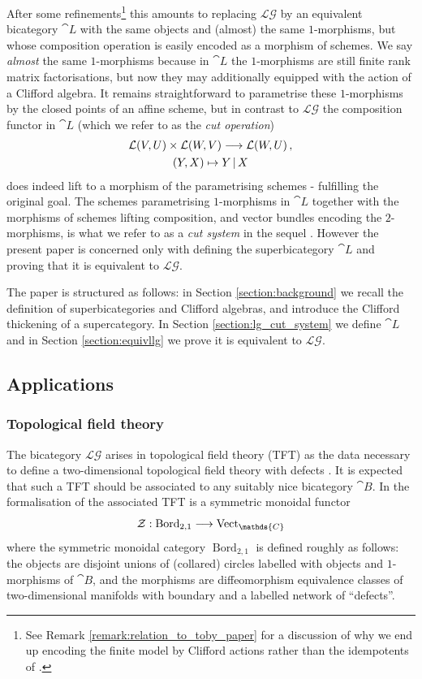\documentclass[english,letter paper,12pt,leqno]{article}
\theoremstyle{example}
\numberwithin{equation}{section}
\def\LG{\mathcal{LG}}
\def\nC{\mathds{C}}
\begin{document}
After some refinements\footnote{See Remark \ref{remark:relation_to_toby_paper} for a discussion of why we end up encoding the finite model by Clifford actions rather than the idempotents of \cite{dm1102.2957}.} this amounts to replacing $\LG$ by an equivalent bicategory $\cat{L}$ with the same objects and (almost) the same $1$-morphisms, but whose composition operation is easily encoded as a morphism of schemes. We say \emph{almost} the same $1$-morphisms because in $\cat{L}$ the $1$-morphisms are still finite rank matrix factorisations, but now they may additionally equipped with the action of a Clifford algebra. It remains straightforward to parametrise these $1$-morphisms by the closed points of an affine scheme, but in contrast to $\LG$ the composition functor in $\cat{L}$ (which we refer to as the \emph{cut operation})
\begin{gather}
\mathcal{L}(V,U) \times \mathcal{L}(W,V) \longrightarrow \mathcal{L}(W,U)\,,\\
(Y,X) \mapsto Y \,|\, X
\end{gather}
does indeed lift to a morphism of the parametrising schemes - fulfilling the original goal. The schemes parametrising $1$-morphisms in $\cat{L}$ together with the morphisms of schemes lifting composition, and vector bundles encoding the $2$-morphisms, is what we refer to as a \emph{cut system} in the sequel \cite{cutsystems2}. However the present paper is concerned only with defining the superbicategory $\cat{L}$ and proving that it is equivalent to $\LG$.

The paper is structured as follows: in Section \ref{section:background} we recall the definition of superbicategories and Clifford algebras, and introduce the Clifford thickening of a supercategory. In Section \ref{section:lg_cut_system} we define $\cat{L}$ and in Section \ref{section:equivllg} we prove it is equivalent to $\LG$.

\subsection{Applications}

\subsubsection{Topological field theory}

The bicategory $\LG$ arises in topological field theory (TFT) as the data necessary to define a two-dimensional topological field theory with defects \cite{k1004.2307,dkr1107.0495}. It is expected that such a TFT should be associated to any suitably nice bicategory $\cat{B}$. In the formalisation of \cite[\S 3.1]{dkr1107.0495} the associated TFT is a symmetric monoidal functor
\[
\mathcal{Z}: \operatorname{Bord}_{2,1} \lto \operatorname{Vect}_\nC
\]
where the symmetric monoidal category $\operatorname{Bord}_{2,1}$ is defined roughly as follows: the objects are disjoint unions of (collared) circles labelled with objects and $1$-morphisms of $\cat{B}$, and the morphisms are diffeomorphism equivalence classes of two-dimensional manifolds with boundary and a labelled network of ``defects''.
\end{document}
